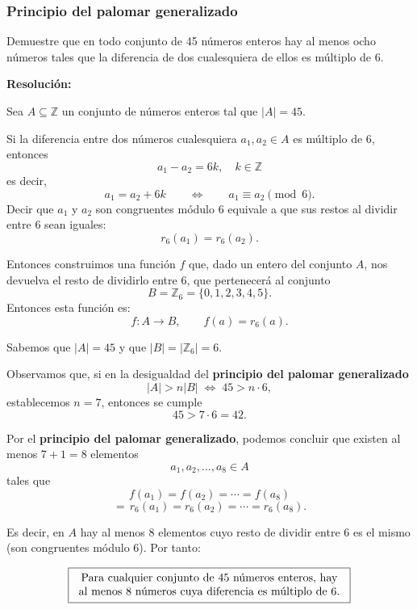\documentclass[a4paper,12pt]{article}
\begin{document}
\subsubsection{Principio del palomar generalizado}

\begin{ejercicio}[title=Ejercicio 39]
Demuestre que en todo conjunto de 45 números enteros hay al menos ocho números tales que la diferencia de dos cualesquiera de ellos es múltiplo de 6.

\tcblower
\textbf{Resolución:}

Sea \(A\subseteq\mathbb{Z}\) un conjunto de números enteros tal que \(|A|=45\).

Si la diferencia entre dos números cualesquiera \(a_1,a_2\in A\) es múltiplo de \(6\), entonces
\[
a_1-a_2 = 6k, \quad k\in\mathbb{Z} 
\]
es decir,
\[
a_1 = a_2 + 6k \qquad \Longleftrightarrow \qquad a_1 \equiv a_2 \pmod{6}.
\]
Decir que \(a_1\) y \(a_2\) son congruentes módulo \(6\) equivale a que sus restos al dividir entre \(6\) sean iguales:
\[
r_6(a_1)=r_6(a_2).
\]

Entonces construimos una función $f$ que, dado un entero del conjunto \(A\), nos devuelva el resto de dividirlo entre \(6\), que pertenecerá al conjunto
\[
B = \mathbb{Z}_6 = \{0,1,2,3,4,5\}.
\]
Entonces esta función es:
\[
f : A \to B,\qquad f(a) = r_6(a).
\]

Sabemos que \(|A| = 45\) y que \(|B| = |\mathbb{Z}_6| = 6\).

\vspace{0.5em}

Observamos que, si en la desigualdad del \textbf{principio del palomar generalizado}
\[
|A| > n|B| \;\Longleftrightarrow\; 45 > n\cdot 6,
\]
establecemos \(n = 7\), entonces se cumple
\[
45 > 7\cdot 6 = 42.
\]

Por el \textbf{principio del palomar generalizado}, podemos concluir que existen al menos \(7+1 = 8\) elementos
\[
a_1,a_2,\dots,a_8 \in A
\]
tales que
\[
f(a_1) = f(a_2) = \cdots = f(a_8)
\]
\[
=\, r_6(a_1) = r_6(a_2) = \cdots = r_6(a_8).
\]

Es decir, en \(A\) hay al menos 8 elementos cuyo resto de dividir entre 6 es el mismo (son congruentes módulo \(6\)).
Por tanto:

$$\text{\fbox{\begin{tabular}{c} Para cualquier conjunto de 45 números enteros, hay \\ al menos 8 números cuya diferencia es múltiplo de 6. \end{tabular}}}$$

\end{ejercicio}
\end{document}
